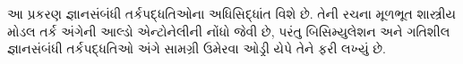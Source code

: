 \documentclass[../../../include/open-logic-chapter]{subfiles}
\begin{document}

\begin{editorial}
  આ પ્રકરણ જ્ઞાનસંબંધી તર્કપદ્ધતિઓના અધિસિદ્ધાંત વિશે છે. તેની
  રચના મૂળભૂત શાસ્ત્રીય મોડલ તર્ક અંગેની આલ્ડો એન્ટોનેલીની નોંધો
  જેવી છે, પરંતુ બિસિમ્યુલેશન અને ગતિશીલ જ્ઞાનસંબંધી તર્કપદ્ધતિઓ
  અંગે સામગ્રી ઉમેરવા ઓડ્રી યેપે તેને ફરી લખ્યું છે.
\end{editorial}



\OLEndPartHook
\end{document}
